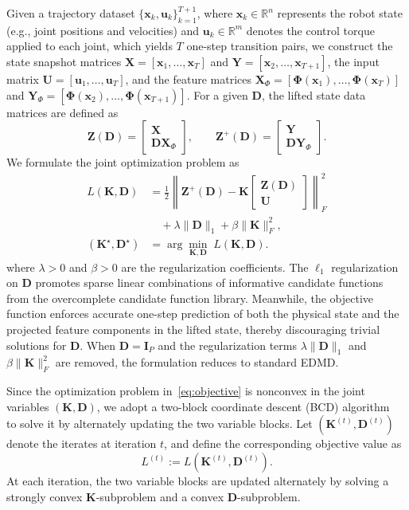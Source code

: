 \documentclass[final,3p,twocolumn,times]{elsarticle}
\newcommand{\R}{\mathbb{R}}
\newcommand{\x}{\mathbf{x}}
\newcommand{\uvec}{\mathbf{u}}
\newcommand{\Kmat}{\mathbf{K}}
\newcommand{\Dmat}{\mathbf{D}}
\newcommand{\I}{\mathbf{I}}
\newcommand{\Zmat}{\mathbf{Z}}
\newcommand{\Umat}{\mathbf{U}}
\newcommand{\X}{\mathbf{X}}
\newcommand{\Y}{\mathbf{Y}}
\newcommand{\Phib}{\boldsymbol{\Phi}}
\newcommand{\XPhi}{\mathbf{X}_{\Phi}}
\newcommand{\YPhi}{\mathbf{Y}_{\Phi}}
\begin{document}
Given a trajectory dataset $\{\x_k, \uvec_k\}_{k=1}^{T+1}$, where $\x_k \in \R^n$ represents the robot state (e.g., joint positions and velocities) and $\uvec_k \in \R^m$ denotes the control torque applied to each joint, which yields $T$ one-step transition pairs, we construct the state snapshot matrices $\X = [\x_1, \dots, \x_T]$ and $\Y = [\x_2, \dots, \x_{T+1}]$, the input matrix $\Umat = [\uvec_1, \dots, \uvec_T]$, and the feature matrices $\XPhi = [\Phib(\x_1), \dots, \Phib(\x_T)]$ and $\YPhi = [\Phib(\x_2), \dots, \Phib(\x_{T+1})]$. For a given $\Dmat$, the lifted state data matrices are defined as
\begin{equation}
\Zmat(\Dmat) =
\begin{bmatrix}
\X \\ \Dmat \XPhi
\end{bmatrix}, \qquad
\Zmat^+(\Dmat) =
\begin{bmatrix}
\Y \\ \Dmat \YPhi
\end{bmatrix}.
\end{equation}
We formulate the joint optimization problem as
\begin{equation}
\label{eq:objective}
\begin{aligned}
L(\Kmat,\Dmat) &= \frac{1}{2}
\left\|
\Zmat^+(\Dmat) - \Kmat
\begin{bmatrix}
\Zmat(\Dmat) \\ \Umat
\end{bmatrix}
\right\|_F^2 \\
&\quad + \lambda\|\Dmat\|_1 + \beta\|\Kmat\|_F^2, \\
(\Kmat^\star, \Dmat^\star) &= \arg\min_{\Kmat,\Dmat} \; L(\Kmat,\Dmat).
\end{aligned}
\end{equation}
where $\lambda>0$ and $\beta>0$ are the regularization coefficients. The $\ell_1$ regularization on $\Dmat$ promotes sparse linear combinations of informative candidate functions from the overcomplete candidate function library. Meanwhile, the objective function enforces accurate one-step prediction of both the physical state and the projected feature components in the lifted state, thereby discouraging trivial solutions for $\Dmat$. When $\Dmat = \I_P$ and the regularization terms $\lambda\|\Dmat\|_1$ and $\beta\|\Kmat\|_F^2$ are removed, the formulation reduces to standard EDMD.

Since the optimization problem in~\eqref{eq:objective} is nonconvex in
the joint variables $(\Kmat,\Dmat)$, we adopt a two-block coordinate
descent (BCD) algorithm~\cite{Tseng2001} to solve it by alternately
updating the two variable blocks. Let $(\Kmat^{(t)},\Dmat^{(t)})$
denote the iterates at iteration $t$, and define the corresponding objective value as
\[
L^{(t)} := L(\Kmat^{(t)},\Dmat^{(t)}).
\]
At each iteration, the two variable blocks are updated alternately by solving a strongly convex $\Kmat$-subproblem and a convex $\Dmat$-subproblem.
\end{document}
